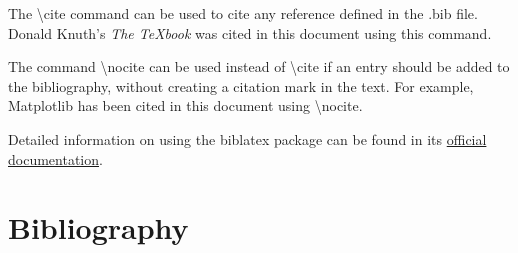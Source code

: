 \documentclass[twoside,openany]{thesis}
\begin{document}
The {\ttfamily\textbackslash cite} command can be used to cite any reference defined in the {\ttfamily*.bib} file.
Donald Knuth's {\itshape The \TeX book} \cite{knuth1984} was cited in this document using this command.

The command {\ttfamily\textbackslash nocite} can be used instead of {\ttfamily\textbackslash cite} if an entry should be added to the bibliography, without creating a citation mark in the text.
For example, Matplotlib has been cited in this document using {\ttfamily\textbackslash nocite}.

Detailed information on using the {\ttfamily biblatex} package can be found in its \href{https://ctan.net/macros/latex/contrib/biblatex/doc/biblatex.pdf}{official documentation}.

\back

\chapter{Bibliography}

\nocite{hunter2007}

\printbibliography[heading=none]
\end{document}
